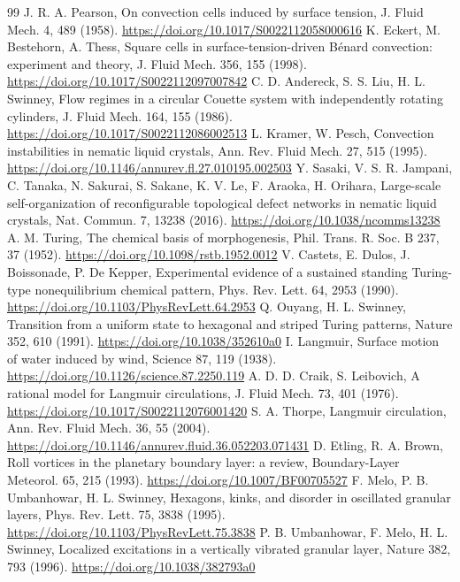 \documentclass[11pt]{article}
\begin{document}
\begin{thebibliography}{99}
 J. R. A. Pearson, On convection cells induced by surface tension, J. Fluid Mech. 4, 489 (1958). \url{https://doi.org/10.1017/S0022112058000616}
 K. Eckert, M. Bestehorn, A. Thess, Square cells in surface-tension-driven Bénard convection: experiment and theory, J. Fluid Mech. 356, 155 (1998). \url{https://doi.org/10.1017/S0022112097007842}
 C. D. Andereck, S. S. Liu, H. L. Swinney, Flow regimes in a circular Couette system with independently rotating cylinders, J. Fluid Mech. 164, 155 (1986). \url{https://doi.org/10.1017/S0022112086002513}
 L. Kramer, W. Pesch, Convection instabilities in nematic liquid crystals, Ann. Rev. Fluid Mech. 27, 515 (1995). \url{https://doi.org/10.1146/annurev.fl.27.010195.002503}
 Y. Sasaki, V. S. R. Jampani, C. Tanaka, N. Sakurai, S. Sakane, K. V. Le, F. Araoka, H. Orihara, Large-scale self-organization of reconfigurable topological defect networks in nematic liquid crystals, Nat. Commun. 7, 13238 (2016). \url{https://doi.org/10.1038/ncomms13238}
 A. M. Turing, The chemical basis of morphogenesis, Phil. Trans. R. Soc. B 237, 37 (1952). \url{https://doi.org/10.1098/rstb.1952.0012}
 V. Castets, E. Dulos, J. Boissonade, P. De Kepper, Experimental evidence of a sustained standing Turing-type nonequilibrium chemical pattern, Phys. Rev. Lett. 64, 2953 (1990). \url{https://doi.org/10.1103/PhysRevLett.64.2953}
 Q. Ouyang, H. L. Swinney, Transition from a uniform state to hexagonal and striped Turing patterns, Nature 352, 610 (1991). \url{https://doi.org/10.1038/352610a0}
 I. Langmuir, Surface motion of water induced by wind, Science 87, 119 (1938). \url{https://doi.org/10.1126/science.87.2250.119}
 A. D. D. Craik, S. Leibovich, A rational model for Langmuir circulations, J. Fluid Mech. 73, 401 (1976). \url{https://doi.org/10.1017/S0022112076001420}
 S. A. Thorpe, Langmuir circulation, Ann. Rev. Fluid Mech. 36, 55 (2004). \url{https://doi.org/10.1146/annurev.fluid.36.052203.071431}
 D. Etling, R. A. Brown, Roll vortices in the planetary boundary layer: a review, Boundary-Layer Meteorol. 65, 215 (1993). \url{https://doi.org/10.1007/BF00705527}
 F. Melo, P. B. Umbanhowar, H. L. Swinney, Hexagons, kinks, and disorder in oscillated granular layers, Phys. Rev. Lett. 75, 3838 (1995). \url{https://doi.org/10.1103/PhysRevLett.75.3838}
 P. B. Umbanhowar, F. Melo, H. L. Swinney, Localized excitations in a vertically vibrated granular layer, Nature 382, 793 (1996). \url{https://doi.org/10.1038/382793a0}

\end{thebibliography}
\end{document}
